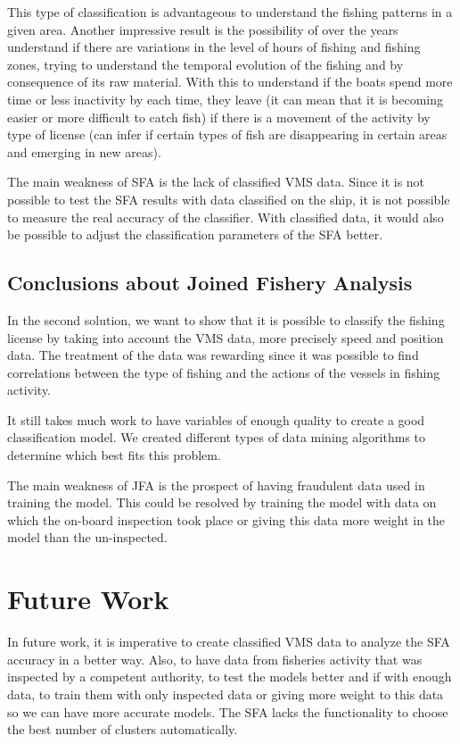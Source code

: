 This type of classification is advantageous to understand the fishing patterns in a given area. Another impressive result is the possibility of over the years understand if there are variations in the level of hours of fishing and fishing zones, trying to understand the temporal evolution of the fishing and by consequence of its raw material. With this to understand if the boats spend more time or less inactivity by each time, they leave (it can mean that it is becoming easier or more difficult to catch fish) if there is a movement of the activity by type of license (can infer if certain types of fish are disappearing in certain areas and emerging in new areas).


The main weakness of SFA is the lack of classified VMS data. Since it is not possible to test the SFA results with data classified on the ship, it is not possible to measure the real accuracy of the classifier. With classified data, it would also be possible to adjust the classification parameters of the SFA better.


\subsection{Conclusions about Joined Fishery Analysis} %
\label{sub:con_jfa}
In the second solution, we want to show that it is possible to classify the fishing license by taking into account the VMS data, more precisely speed and position data.
The treatment of the data was rewarding since it was possible to find correlations between the type of fishing and the actions of the vessels in fishing activity.

It still takes much work to have variables of enough quality to create a good classification model.
We created different types of data mining algorithms to determine which best fits this problem.

The main weakness of JFA is the prospect of having fraudulent data used in training the model. This could be resolved by training the model with data on which the on-board inspection took place or giving this data more weight in the model than the un-inspected.



\section{Future Work} %
\label{sub:future_work}

In future work, it is imperative to create classified VMS data to analyze the SFA accuracy in a better way. Also, to have data from fisheries activity that was inspected by a competent authority, to test the models better and if with enough data, to train them with only inspected data or giving more weight to this data so we can have more accurate models.
The SFA lacks the functionality to choose the best number of clusters automatically.
 







